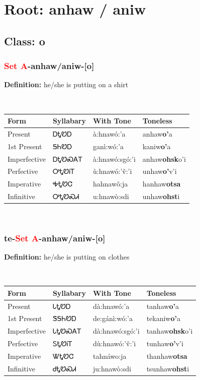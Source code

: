 \needspace{4in}
\section*{Root: anhaw / aniw}
\nopagebreak
{}
\needspace{3in}
\subsection*{Class: o}
\nopagebreak
\needspace{2in}
\subsubsection*{\textcolor{Red}{Set A}{-}\textbf{anhaw/aniw}{-}[o]}
\nopagebreak
\textbf{Definition: } he/she is putting on a shirt
\\[0.5em]
\begin{tabularx}{\textwidth}{l X X X}%
\toprule%
\textbf{Form}&\textbf{Syllabary}&\textbf{With Tone}&\textbf{Toneless}\\%
\midrule%
Present&ᎠᎿᏬᎠ&à:hnawó:’a&anhaw\textbf{o'}a\\%
1st Present&ᎦᏂᏬᎠ&ganì:wó:’a&kaniw\textbf{o'}a\\%
Imperfective&ᎠᎿᏬᏍᎪᎢ&à:hnawó:sgó:’i&anhaw\textbf{ohsk}o'i\\%
Perfective&ᎤᎿᏬᎥᎢ&ù:hnawó:’v̌:’i&unhaw\textbf{o'}v'i\\%
Imperative&ᎭᎿᏬᏣ&hahnawǒ:ja&hanhaw\textbf{otsa}\\%
Infinitive&ᎤᎿᏬᏍᏗ&u:hnawò:sdi&unhaw\textbf{ohst}i\\%
\bottomrule%
\end{tabularx}
\\[1em]
\needspace{2in}
\subsubsection*{te{-}\textcolor{Red}{Set A}{-}\textbf{anhaw/aniw}{-}[o]}
\nopagebreak
\textbf{Definition: } he/she is putting on clothes
\\[0.5em]
\begin{tabularx}{\textwidth}{l X X X}%
\toprule%
\textbf{Form}&\textbf{Syllabary}&\textbf{With Tone}&\textbf{Toneless}\\%
\midrule%
Present&ᏓᎿᏬᎠ&dà:hnawó:’a&tanhaw\textbf{o'}a\\%
1st Present&ᏕᎦᏂᏬᎠ&de:gánì:wó:’a&tekaniw\textbf{o'}a\\%
Imperfective&ᏓᎿᏬᏍᎪᎢ&dà:hnawó:sgó:’i&tanhaw\textbf{ohsk}o'i\\%
Perfective&ᏚᎿᏬᎥᎢ&dù:hnawó:’v̌:’i&tunhaw\textbf{o'}v'i\\%
Imperative&ᏔᎿᏬᏣ&tahnáwo:ja&thanhaw\textbf{otsa}\\%
Infinitive&ᏧᎿᏬᏍᏗ&ju:hnawò:sdi&tsunhaw\textbf{ohst}i\\%
\bottomrule%
\end{tabularx}
\\[1em]
\needspace{3in}
